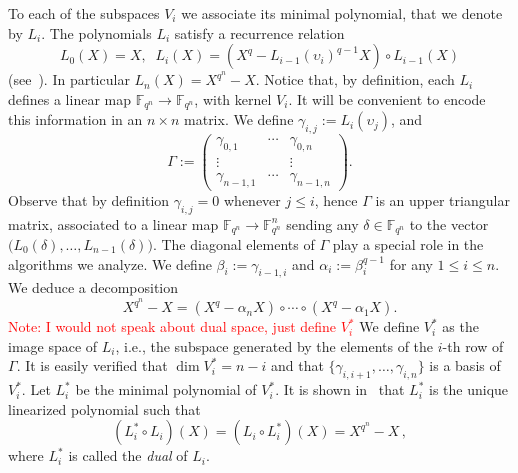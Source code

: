 \documentclass{article}
\newcommand{\ff}[1]{\mathbb{F}_{#1}}
\newcommand{\qq}{q}
\newcommand{\nn}{n}
\newcommand{\qn}{{\qq^\nn}}
\newcommand{\extf}{\ff{\qn}}
\newcounter{algo}
\newcommand{\Notes}[1]{\textcolor{red}{Note: #1}}
\begin{document}
To each of the subspaces $V_i$ we associate its minimal polynomial, that we denote by
$L_i$. The polynomials $L_i$ satisfy a recurrence relation 
\begin{equation}
\label{Li_generation}
  L_0(X) = X, \; \;  L_i(X) = (X^\qq - L_{i-1}(\upsilon_i)^{\qq-1}X)\circ L_{i-1}(X)
\end{equation}
(see~\cite[Ch. 11]{mBER84a}). In particular $L_\nn(X)=X^\qn-X$. Notice that, by definition, each $L_i$ defines a linear map
$\extf\to\extf$, with kernel $V_i$. It will be convenient to encode
this information in an $\nn\times\nn$ matrix. We define
$\gamma_{i,j}:=L_i(\upsilon_j)$, and
\begin{equation}
  \label{eq:Gamma}
  \Gamma :=
  \begin{pmatrix}
    \gamma_{0,1} & \cdots & \gamma_{0,\nn}\\
    \vdots & & \vdots\\
    \gamma_{\nn-1,1} & \cdots & \gamma_{\nn-1,\nn}
  \end{pmatrix}.
\end{equation}
Observe that by definition $\gamma_{i,j}=0$ whenever $j\le i$, hence
$\Gamma$ is an upper triangular matrix, associated to a linear map
$\extf\to\extf^\nn$ sending any $\delta\in\extf$ to the vector
$\bigl(L_0(\delta),\dots,\allowbreak L_{n-1}(\delta)\bigr)$.  The diagonal elements of $\Gamma$ play a special role in the algorithms we analyze.
We define $\beta_i:=\gamma_{i-1,i}$ and $\alpha_i:=\beta_i^{\qq-1}$
for any $1\le i \le \nn$. We deduce a decomposition
\begin{equation}
\label{decomposition_field_eq_gen}
  X^\qn - X = (X^\qq - \alpha_\nn X) \circ \cdots \circ (X^\qq - \alpha_1 X).
\end{equation}
\Notes{I would not speak about dual space, just define $V_i^\ast$}
We define $V_i^\ast$ as the image space of $L_i$, i.e., the subspace
generated by the elements of the $i$-th row of $\Gamma$.  It is easily verified that
$\dim V_i^\ast=n-i$ and that $\{\gamma_{i,i+1},\dots,\gamma_{i,\nn}\}$
is a basis of $V_i^\ast$. Let $L_i^\ast$ be the minimal polynomial of
$V_i^\ast$. It is shown in~\cite[Ch. 11]{mBER84a} that
$L_i^\ast$ is the unique linearized polynomial such that
\begin{equation}
\label{dual_polynomial}
(L_i^\ast \circ L_i)(X)=(L_i \circ L_i^\ast)(X)=X^\qn-X\,,
\end{equation}
where $L_i^\ast$ is called the \emph{dual} of $L_i$.

\medskip
\end{document}
